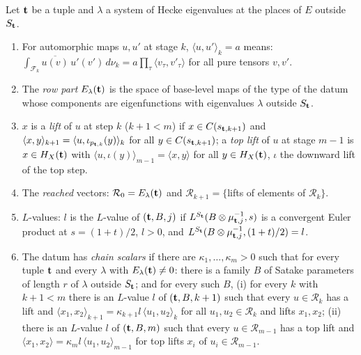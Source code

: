 \begin{definition}\label{pf:bundles:def:scalars}
Let $\mathbf t$ be a tuple and $\lambda$ a system of Hecke eigenvalues at the places of $E$ outside $S_\mathbf t$.
\begin{enumerate}[label=(\alph*)]
\item For automorphic maps $u,u'$ at stage $k$, $\langle u,u'\rangle_k=a$ means: $\int_{\mathcal F_k}\overline{u(v)}\,u'(v')\,d\nu_k=a\prod_\tau
\langle v_\tau,v'_\tau\rangle$ for all pure tensors $v,v'$.
\item The \emph{row part} $E_\lambda(\mathbf t)$ is the space of base-level maps of the type of the datum whose components are eigenfunctions
with eigenvalues $\lambda$ outside $S_\mathbf t$.
\item $x$ is a \emph{lift} of $u$ at step $k$ ($k+1<m$) if $x\in C(s_{\mathbf t,k+1})$ and $\langle x,y\rangle_{k+1}=\langle
u,\iota_{p_{\mathbf t,k}}(y)\rangle_k$ for all $y\in C(s_{\mathbf t,k+1})$; a \emph{top lift} of $u$ at stage $m-1$ is $x\in H_X(\mathbf t)$ with
$\langle u,\iota(y)\rangle_{m-1}=\langle x,y\rangle$ for all $y\in H_X(\mathbf t)$, $\iota$ the downward lift of the top step.
\item The \emph{reached} vectors: $\mathcal R_0=E_\lambda(\mathbf t)$ and $\mathcal R_{k+1}=\{$lifts of elements of $\mathcal R_k\}$.
\item $L$-values: $l$ is the $L$-value of $(\mathbf t,B,j)$ if $L^{S_\mathbf t}(B\otimes\mu_{\mathbf t,j}^{-1},s)$ is a convergent Euler product at
$s=(1+t)/2$, $l>0$, and $L^{S_\mathbf t}(B\otimes\mu_{\mathbf t,j}^{-1},(1+t)/2)=l$.
\item The datum has \emph{chain scalars} if there are $\kappa_1,\dots,\kappa_m>0$ such that for every tuple $\mathbf t$ and every $\lambda$ with
$E_\lambda(\mathbf t)\ne0$: there is a family $B$ of Satake parameters of length $r$ of $\lambda$ outside $S_\mathbf t$; and for every such $B$, (i)
for every $k$ with $k+1<m$ there is an $L$-value $l$ of $(\mathbf t,B,k+1)$ such that every $u\in\mathcal R_k$ has a lift and $\langle
x_1,x_2\rangle_{k+1}=\kappa_{k+1}l\,\langle u_1,u_2\rangle_k$ for all $u_1,u_2\in\mathcal R_k$ and lifts $x_1,x_2$; (ii) there is an
$L$-value $l$ of $(\mathbf t,B,m)$ such that every $u\in\mathcal R_{m-1}$ has a top lift and $\langle x_1,x_2\rangle=\kappa_m l\,\langle
u_1,u_2\rangle_{m-1}$ for top lifts $x_i$ of $u_i\in\mathcal R_{m-1}$.
\end{enumerate}
\end{definition}

